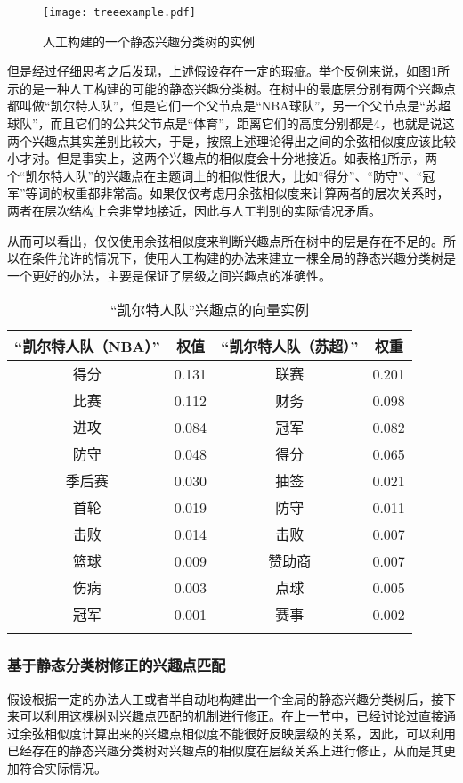 \begin{figure}[ht]
\centering
\texttt{[image: treeexample.pdf]}
\caption{人工构建的一个静态兴趣分类树的实例}
\label{fig:treeexample}
\end{figure}

但是经过仔细思考之后发现，上述假设存在一定的瑕疵。举个反例来说，如图\ref{fig:treeexample}所示的是一种人工构建的可能的静态兴趣分类树。在树中的最底层分别有两个兴趣点都叫做“凯尔特人队”，但是它们一个父节点是“NBA球队”，另一个父节点是“苏超球队”，而且它们的公共父节点是“体育”，距离它们的高度分别都是4，也就是说这两个兴趣点其实差别比较大，于是，按照上述理论得出之间的余弦相似度应该比较小才对。但是事实上，这两个兴趣点的相似度会十分地接近。如表格\ref{tbl:celtics}所示，两个“凯尔特人队”的兴趣点在主题词上的相似性很大，比如“得分”、“防守”、“冠军”等词的权重都非常高。如果仅仅考虑用余弦相似度来计算两者的层次关系时，两者在层次结构上会非常地接近，因此与人工判别的实际情况矛盾。

从而可以看出，仅仅使用余弦相似度来判断兴趣点所在树中的层是存在不足的。所以在条件允许的情况下，使用人工构建的办法来建立一棵全局的静态兴趣分类树是一个更好的办法，主要是保证了层级之间兴趣点的准确性。

\begin{table}[ht]
\caption{“凯尔特人队”兴趣点的向量实例}
\centering
\begin{tabular}{cc|cc} 
\hline
“凯尔特人队（NBA）” & 权值 & “凯尔特人队（苏超）” & 权重 \\
\hline
得分 & 0.131 & 联赛 & 0.201 \\
比赛 & 0.112 & 财务 & 0.098 \\
进攻 & 0.084 & 冠军& 0.082 \\
防守 & 0.048 & 得分 & 0.065 \\
季后赛 & 0.030 & 抽签 & 0.021 \\
首轮 & 0.019 & 防守 & 0.011 \\
击败 & 0.014 & 击败 & 0.007 \\
篮球 & 0.009 & 赞助商 & 0.007 \\
伤病 & 0.003 & 点球 & 0.005 \\
冠军 & 0.001 & 赛事 & 0.002 \\
\hline
\label{tbl:celtics}
\end{tabular}
\end{table}

\subsubsection{基于静态分类树修正的兴趣点匹配}
假设根据一定的办法人工或者半自动地构建出一个全局的静态兴趣分类树后，接下来可以利用这棵树对兴趣点匹配的机制进行修正。在上一节中，已经讨论过直接通过余弦相似度计算出来的兴趣点相似度不能很好反映层级的关系，因此，可以利用已经存在的静态兴趣分类树对兴趣点的相似度在层级关系上进行修正，从而是其更加符合实际情况。

